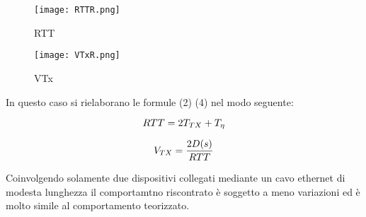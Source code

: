 \documentclass[../lab2.tex]{subfiles}
\begin{document}
\begin{figure}[!htb]
    \begin{minipage}{0.48\textwidth}
        \centering
        \texttt{[image: RTTR.png]}
        \vspace{-20pt}
        \caption{RTT}\label{RTTR}
    \end{minipage}\hfill
    \begin{minipage}{0.48\textwidth}
        \centering
        \texttt{[image: VTxR.png]}
        \vspace{-20pt}
        \caption{VTx}\label{VTxR}
    \end{minipage}
\end{figure}

In questo caso si rielaborano le formule (2) (4) nel modo seguente:

\begin{equation}
    \centering
    RTT = 2T_{TX} + T_{\eta}
\end{equation}

\begin{equation}
    \centering
    V_{TX} = \frac{2D(s)}{RTT}
\end{equation}

Coinvolgendo solamente due dispositivi collegati mediante un cavo ethernet di modesta lunghezza
il comportamtno riscontrato è soggetto a meno variazioni ed è molto simile al comportamento 
teorizzato.
\end{document}
